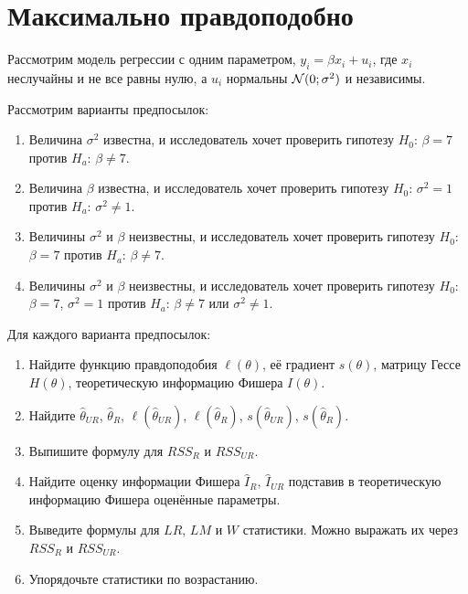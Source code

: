 \section{Максимально правдоподобно}

\begin{problem}
Рассмотрим модель регрессии с одним параметром, $y_i = \beta x_i + u_i$,
где $x_i$ неслучайны и не все равны нулю, а $u_i$ нормальны $\mathcal{N}(0;\sigma^2)$ и независимы.

Рассмотрим варианты предпосылок:

\begin{enumerate}
    \item Величина $\sigma^2$ известна,
    и исследователь хочет проверить гипотезу $H_0$: $\beta = 7$ против $H_a$: $\beta \neq 7$.
    \item Величина $\beta$ известна,
    и исследователь хочет проверить гипотезу $H_0$: $\sigma^2 = 1$ против $H_a$: $\sigma^2 \neq 1$.
    \item Величины $\sigma^2$ и $\beta$ неизвестны,
    и исследователь хочет проверить гипотезу $H_0$: $\beta = 7$ против $H_a$: $\beta \neq 7$.
    \item Величины $\sigma^2$ и $\beta$ неизвестны,
    и исследователь хочет проверить гипотезу $H_0$: $\beta = 7$, $\sigma^2 = 1$ против $H_a$: $\beta \neq 7$ или $\sigma^2 \neq 1$.
\end{enumerate}

Для каждого варианта предпосылок:

\begin{enumerate}
    \item Найдите функцию правдоподобия $\ell(\theta)$, её градиент $s(\theta)$,
    матрицу Гессе $H(\theta)$, теоретическую информацию Фишера $I(\theta)$.
    \item Найдите $\hat\theta_{UR}$, $\hat\theta_R$, $\ell(\hat\theta_{UR})$,
    $\ell(\hat\theta_R)$, $s(\hat\theta_{UR})$, $s(\hat\theta_R)$.
    \item Выпишите формулу для $RSS_R$ и $RSS_{UR}$.
    \item Найдите оценку информации Фишера $\hat I_R$, $\hat I_{UR}$
    подставив в теоретическую информацию Фишера оценённые параметры.
    \item Выведите формулы для $LR$, $LM$ и $W$ статистики.
    Можно выражать их через $RSS_R$ и $RSS_{UR}$.
    \item Упорядочьте статистики по возрастанию.
\end{enumerate}


\begin{sol}

\end{sol}
\end{problem}




